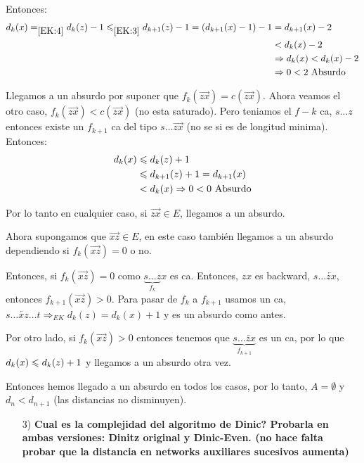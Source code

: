 \documentclass[12pt,a4paper]{article}
\begin{document}
Entonces:
\begin{align*}
    d_{k}(x) =_{\eqref{EK:4}} d_{k}(z)-1 \leqslant _{\eqref{EK:3}} d_{k+1}(z) -1 = (d_{k+1}(x)-1)-1 &= d_{k+1}(x) -2\\
    &<d_{k}(x) -2\\
    &\Rightarrow d_{k}(x) < d_{k}(x)-2 \\
    &\Rightarrow 0 < 2 \,\,\text{Absurdo}
\end{align*}

Llegamos a un absurdo por suponer que $f_{k}(\overrightarrow{zx}) = c(\overrightarrow{zx})$. 
Ahora veamos el otro caso, $f_{k}(\overrightarrow{zx}) < c(\overrightarrow{zx})$ 
(no esta saturado). Pero teniamos el $f-k$ ca, $s \ldots z$ entonces existe un 
$f_{k+1}$ ca del tipo $s\ldots \overrightarrow{zx}$ (no se si es de longitud 
minima). Entonces:
\begin{align*}
    d_{k}(x) &\leqslant d_{k}(z)+1\\
    & \leqslant d_{k+1}(z) +1 = d_{k+1}(x)\\
    & < d_{k}(x) \Rightarrow 0 < 0 \,\,\text{Absurdo}
\end{align*}

Por lo tanto en cualquier caso, si $\overrightarrow{zx} \in E$, llegamos a un 
absurdo.
\medskip

Ahora supongamos que $\overrightarrow{xz} \in E$, en este caso también llegamos 
a un absurdo dependiendo si $f_{k}(\overrightarrow{xz}) = 0$ o no.
\medskip

Entonces, si $f_{k}(\overrightarrow{xz}) = 0$ como $\underbrace{s\ldots z}_{f_{k}}x$ es ca. 
Entonces, $zx$ es backward, $s\ldots \overleftarrow{zx}$, entonces 
$f_{k+1}(\overrightarrow{xz}) > 0$. Para pasar de $f_{k}$ a $f_{k+1}$ usamos un ca, 
$s\ldots \overleftarrow{xz} \ldots t\Rightarrow_{EK} d_{k}(z) = d_{k}(x)+1$ 
y es un absurdo como antes. 
\medskip

Por otro lado, si $f_{k}(\overrightarrow{xz}) > 0$ entonces 
tenemos que $\underbrace{s\ldots \overleftarrow{zx}}_{f_{k+1}}$ es un ca, por lo 
que $d_{k}(x)\leqslant d_{k}(z)+1$ y llegamos a un absurdo otra vez.
\medskip

Entonces hemos llegado a un absurdo en todos los casos, por lo tanto, $A = \emptyset$ 
y $d_{n} < d_{n+1}$ (las distancias no disminuyen).

\begin{itemize}
    \item [3)] \textbf{Cual es la complejidad del algoritmo de Dinic? Probarla en ambas 
    versiones: Dinitz original y Dinic-Even. (no hace falta probar que la distancia 
    en networks auxiliares sucesivos aumenta)}
    \label{dem:Dinic}
\end{itemize}
\end{document}
